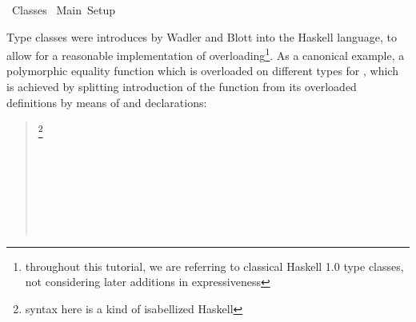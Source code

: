 %
\begin{isabellebody}%
\def\isabellecontext{Classes}%
%
\isadelimtheory
%
\endisadelimtheory
%
\isatagtheory
{}\isamarkupfalse%
\ Classes\isanewline
{}\ Main\ Setup\isanewline
{}%
\endisatagtheory
{\isafoldtheory}%
%
\isadelimtheory
%
\endisadelimtheory
%
\isamarkuptrue%
%
\isamarkuptrue%
%
\begin{isamarkuptext}%
Type classes were introduces by Wadler and Blott \cite{wadler89how}
  into the Haskell language, to allow for a reasonable implementation
  of overloading\footnote{throughout this tutorial, we are referring
  to classical Haskell 1.0 type classes, not considering
  later additions in expressiveness}.
  As a canonical example, a polymorphic equality function
   which is overloaded on different
  types for \isa{{\isasymalpha}}, which is achieved by splitting introduction
  of the  function from its overloaded definitions by means
  of  and  declarations:

  \begin{quote}

  \noindent{}\footnote{syntax here is a kind of isabellized Haskell} \\
  \hspace*{2ex}

  \medskip\noindent{} \\
  \hspace*{2ex} \\
  \hspace*{2ex} \\
  \hspace*{2ex} \\
  \hspace*{2ex}

  \medskip\noindent{} \\
  \hspace*{2ex}


\end{quote}
\end{isamarkuptext}
\end{isabellebody}
